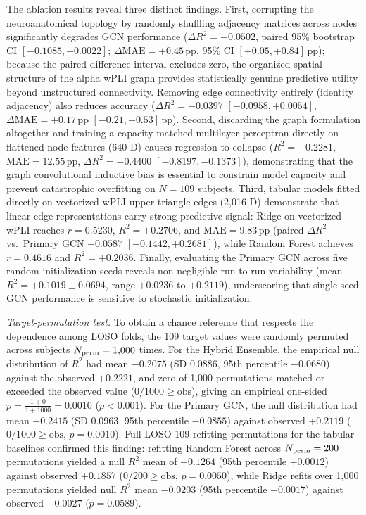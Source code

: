 \documentclass{ieeeaccess}
\newcommand{\pp}{\,\text{pp}}
\begin{document}
The ablation results reveal three distinct findings. First, corrupting the neuroanatomical topology by randomly shuffling adjacency matrices across nodes significantly degrades GCN performance ($\Delta R^2 = -0.0502$, paired 95\% bootstrap CI $[-0.1085, -0.0022]$; $\Delta\text{MAE} = +0.45\pp$, 95\% CI $[+0.05, +0.84]\pp$); because the paired difference interval excludes zero, the organized spatial structure of the alpha wPLI graph provides statistically genuine predictive utility beyond unstructured connectivity. Removing edge connectivity entirely (identity adjacency) also reduces accuracy ($\Delta R^2 = -0.0397$ $[-0.0958, +0.0054]$, $\Delta\text{MAE} = +0.17\pp$ $[-0.21, +0.53]\pp$). Second, discarding the graph formulation altogether and training a capacity-matched multilayer perceptron directly on flattened node features (640-D) causes regression to collapse ($R^2 = -0.2281$, $\text{MAE} = 12.55\pp$, $\Delta R^2 = -0.4400$ $[-0.8197, -0.1373]$), demonstrating that the graph convolutional inductive bias is essential to constrain model capacity and prevent catastrophic overfitting on $N=109$ subjects. Third, tabular models fitted directly on vectorized wPLI upper-triangle edges (2,016-D) demonstrate that linear edge representations carry strong predictive signal: Ridge on vectorized wPLI reaches $r = 0.5230$, $R^2 = +0.2706$, and $\text{MAE} = 9.83\pp$ (paired $\Delta R^2$ vs.\ Primary GCN $+0.0587$ $[-0.1442, +0.2681]$), while Random Forest achieves $r = 0.4616$ and $R^2 = +0.2036$. Finally, evaluating the Primary GCN across five random initialization seeds reveals non-negligible run-to-run variability (mean $R^2 = +0.1019 \pm 0.0694$, range $+0.0236$ to $+0.2119$), underscoring that single-seed GCN performance is sensitive to stochastic initialization.

\textit{Target-permutation test.} To obtain a chance reference that respects the dependence among LOSO folds, the 109 target values were randomly permuted across subjects $N_{\rm perm} = 1{,}000$ times. For the Hybrid Ensemble, the empirical null distribution of $R^2$ had mean $-0.2075$ (SD $0.0886$, 95th percentile $-0.0680$) against the observed $+0.2221$, and zero of 1,000 permutations matched or exceeded the observed value ($0/1000 \ge \text{obs}$), giving an empirical one-sided $p = \frac{1+0}{1+1000} = 0.0010$ ($p < 0.001$). For the Primary GCN, the null distribution had mean $-0.2415$ (SD $0.0963$, 95th percentile $-0.0855$) against observed $+0.2119$ ($0/1000 \ge \text{obs}$, $p = 0.0010$). Full LOSO-109 refitting permutations for the tabular baselines confirmed this finding: refitting Random Forest across $N_{\rm perm} = 200$ permutations yielded a null $R^2$ mean of $-0.1264$ (95th percentile $+0.0012$) against observed $+0.1857$ ($0/200 \ge \text{obs}$, $p = 0.0050$), while Ridge refits over 1,000 permutations yielded null $R^2$ mean $-0.0203$ (95th percentile $-0.0017$) against observed $-0.0027$ ($p = 0.0589$).
\end{document}
